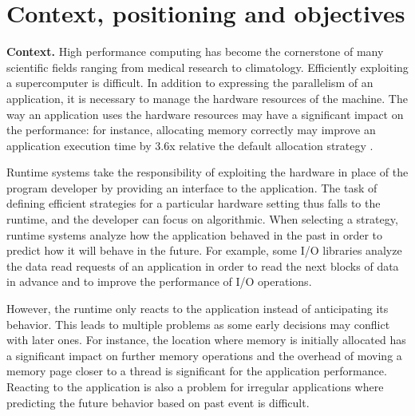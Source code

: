 \documentclass[a4paper,11pt,defblank]{article}
\begin{document}
\section{Context, positioning and objectives}


\textbf{Context.}  High performance computing has become the
cornerstone of many scientific fields ranging from medical research
to climatology.
%
Efficiently exploiting a supercomputer is difficult. In addition to
expressing the parallelism of an application, it is necessary to
manage the hardware resources of the machine. The way an application
uses the hardware resources may have a significant impact on the
performance: for instance, allocating memory correctly may improve an
application execution time by 3.6x relative the default allocation
strategy \cite{carrefour}.

Runtime systems take the responsibility of exploiting the hardware in
place of the program developer by providing an interface to the
application. The task of defining efficient strategies for a
particular hardware setting thus falls to the runtime, and the
developer can focus on algorithmic.
%
When selecting a strategy, runtime systems analyze how the application
behaved in the past in order to predict how it will behave in the
future.
%
For example, some I/O libraries analyze the data read requests of an
application in order to read the next blocks of data in advance and to
improve the performance of I/O operations.

However, the runtime only reacts to the application instead of
anticipating its behavior. This leads to multiple problems as some
early decisions may conflict with later ones. For instance, the
location where memory is initially allocated has a significant impact
on further memory operations and the overhead of moving a memory page
closer to a thread is significant for the application
performance. Reacting to the application is also a problem for
irregular applications where predicting the future behavior based on
past event is difficult.
\end{document}
